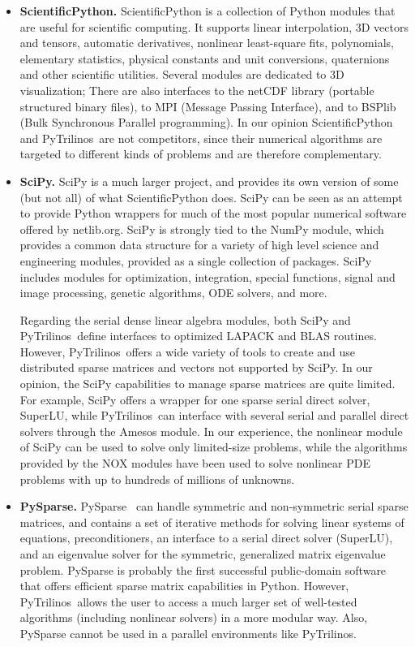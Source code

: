 \documentclass[acmtocl]{acmtrans2m}
\newcommand{\PyTrilinos}{{PyTrilinos}}
\begin{document}
\begin{itemize}
\item {\bf ScientificPython.}  ScientificPython is a collection of
  Python modules that are useful for scientific computing.  It
  supports linear interpolation, 3D vectors and tensors, automatic
  derivatives, nonlinear least-square fits, polynomials, elementary
  statistics, physical constants and unit conversions, quaternions and
  other scientific utilities.  Several modules are dedicated to 3D
  visualization; There are also interfaces to the netCDF library
  (portable structured binary files), to MPI (Message Passing
  Interface), and to BSPlib (Bulk Synchronous Parallel programming).
  In our opinion ScientificPython and \PyTrilinos\ are not
  competitors, since their numerical algorithms are targeted to
  different kinds of problems and are therefore complementary.

\item {\bf SciPy.} SciPy is a much larger project, and provides its
  own version of some (but not all) of what ScientificPython does.
  SciPy can be seen as an attempt to provide Python wrappers for much
  of the most popular numerical software offered by netlib.org.  SciPy
  is strongly tied to the NumPy module, which provides a common data
  structure for a variety of high level science and engineering
  modules, provided as a single collection of packages.  SciPy
  includes modules for optimization, integration, special functions,
  signal and image processing, genetic algorithms, ODE solvers, and
  more.

  Regarding the serial dense linear algebra modules, both SciPy and
  \PyTrilinos\ define interfaces to optimized LAPACK and BLAS
  routines. However, \PyTrilinos\ offers a wide variety of tools to
  create and use distributed sparse matrices and vectors not supported
  by SciPy.  In our opinion, the SciPy capabilities to manage sparse
  matrices are quite limited.  For example, SciPy offers a wrapper for
  one sparse serial direct solver, SuperLU, while \PyTrilinos\ can
  interface with several serial and parallel direct solvers through
  the Amesos module.  In our experience, the nonlinear module of SciPy
  can be used to solve only limited-size problems, while the
  algorithms provided by the NOX modules have been used to solve
  nonlinear PDE problems with up to hundreds of millions of unknowns.

\item {\bf PySparse.}  PySparse~\cite{broker05using} can handle
  symmetric and non-symmetric serial sparse matrices, and contains a
  set of iterative methods for solving linear systems of equations,
  preconditioners, an interface to a serial direct solver (SuperLU),
  and an eigenvalue solver for the symmetric, generalized matrix
  eigenvalue problem.  PySparse is probably the first successful
  public-domain software that offers efficient sparse matrix
  capabilities in Python.  However, \PyTrilinos\ allows
  the user to access a much larger set of well-tested algorithms
  (including nonlinear solvers) in a more modular way.  Also, PySparse
  cannot be used in a parallel environments like \PyTrilinos.

\end{itemize}
\end{document}
